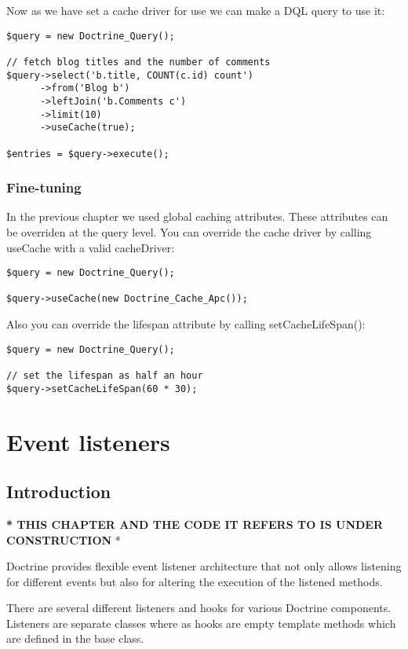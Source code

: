 \documentclass[11pt,a4paper]{report}
\begin{document}
Now as we have set a cache driver for use we can make a DQL query to use it:

\begin{verbatim}
$query = new Doctrine_Query();

// fetch blog titles and the number of comments
$query->select('b.title, COUNT(c.id) count')
      ->from('Blog b')
      ->leftJoin('b.Comments c')
      ->limit(10)
      ->useCache(true);

$entries = $query->execute();
\end{verbatim}

\subsection{Fine-tuning}
In the previous chapter we used global caching attributes. These attributes can be overriden at the query level. You can override the cache driver by calling useCache with a valid cacheDriver:

\begin{verbatim}
$query = new Doctrine_Query();

$query->useCache(new Doctrine_Cache_Apc());
\end{verbatim}

Also you can override the lifespan attribute by calling setCacheLifeSpan():

\begin{verbatim}
$query = new Doctrine_Query();

// set the lifespan as half an hour
$query->setCacheLifeSpan(60 * 30);
\end{verbatim}

\chapter{Event listeners}
\section{Introduction}
\textbf{* THIS CHAPTER AND THE CODE IT REFERS TO IS UNDER CONSTRUCTION }*

Doctrine provides flexible event listener architecture that not only allows listening for different events but also for altering the execution of the listened methods.

There are several different listeners and hooks for various Doctrine components. Listeners are separate classes where as hooks are empty template methods which are defined in the base class.
\end{document}
